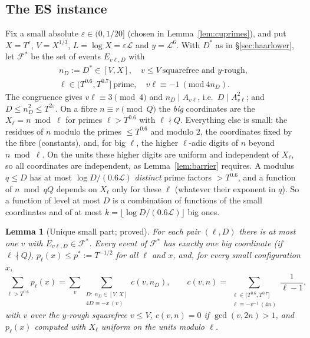 \documentclass[11pt,reqno]{amsart}
\newtheorem{lemma}[theorem]{Lemma}
\theoremstyle{definition}
\newcommand{\Lc}{\mathcal L}
\begin{document}
\subsection*{The ES instance}
Fix a small absolute $\varepsilon\in(0,1/20]$ (chosen in Lemma~\ref{lem:cuprimes}), and put
$X=T^\varepsilon$, $V=X^{1/3}$, $L=\log X=\varepsilon\Lc$ and $y=\Lc^6$.  With
$D^*$ as in \S\ref{sec:haarlower}, let $\mathcal F^*$ be the set of events
$E_{v\ell,D}$ with
\begin{multline*}
 n_D:=D^*\in[V,X],\quad v\le V\ \text{squarefree and $y$-rough},\\
 \ell\in(T^{0.6},T^{0.7}]\ \text{prime},\quad v\ell\equiv-1\ (\mathrm{mod}\ 4n_D).
\end{multline*}
The congruence gives $v\ell\equiv3\pmod4$ and $n_D\mid A_{v\ell}$, i.e.\ $D\mid A_{v\ell}^2$;
and $D\le n_D^2\le T^{2\varepsilon}$.  On a fibre $n\equiv r\pmod Q$ the \emph{big}
coordinates are the $X_\ell=n\bmod\ell$ for primes $\ell>T^{0.6}$ with $\ell\nmid Q$.
Everything else is small: the residues of $n$ modulo the primes $\le T^{0.6}$
and modulo $2$, the coordinates fixed by the fibre (constants), and, for big
$\ell$, the higher $\ell$-adic digits of $n$ beyond $n\bmod\ell$.  On the units these
higher digits are uniform and independent of $X_\ell$, so all coordinates are
independent, as Lemma~\ref{lem:barrier} requires.  A modulus $q\le D$ has at
most $\log D/(0.6\Lc)$ \emph{distinct} prime factors $>T^{0.6}$, and a function
of $n\bmod qQ$ depends on $X_\ell$ only for these $\ell$ (whatever their exponent
in $q$).  So a function of level at most $D$ is a combination of functions
of the small coordinates and of at most $k=\lfloor\log D/(0.6\Lc)\rfloor$ big
ones.

\begin{lemma}[Unique small part; proved]\label{lem:unique}
For each pair $(\ell,D)$ there is at most one $v$ with $E_{v\ell,D}\in\mathcal F^*$.
Every event of $\mathcal F^*$ has exactly one big coordinate (if $\ell\nmid Q$),
$p_\ell(x)\le p^*:=T^{-1/2}$ for all $\ell$ and $x$, and, for every small
configuration $x$,
\[
 \sum_{\ell>T^{0.6}}p_\ell(x)=\sum_v\sum_{\substack{D:\ n_D\in[V,X]\\ 4D\equiv-x\ (v)}}c(v,n_D),\qquad
 c(v,n)=\sum_{\substack{\ell\in(T^{0.6},T^{0.7}]\\ \ell\equiv-v^{-1}\ (4n)}}\frac1{\ell-1},
\]
with $v$ over the $y$-rough squarefree $v\le V$, $c(v,n)=0$ if $\gcd(v,2n)>1$,
and $p_\ell(x)$ computed with $X_\ell$ uniform on the units modulo $\ell$.
\end{lemma}
\end{document}
